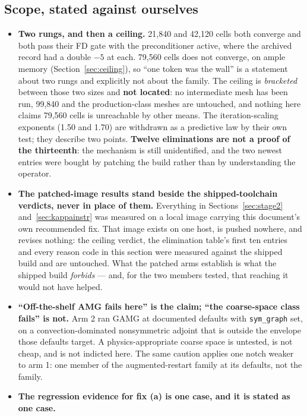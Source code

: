 \documentclass[11pt,a4paper]{article}
\begin{document}
\subsection{Scope, stated against ourselves}

\begin{itemize}
\item \textbf{Two rungs, and then a ceiling.} 21{,}840 and 42{,}120 cells both converge and
both pass their FD gate with the preconditioner active, where the archived record had a double
\(-5\) at each. 79{,}560 cells does not converge, on ample memory
(Section~\ref{sec:ceiling}), so ``one token was the wall'' is a statement about two rungs and
explicitly not about the family. The ceiling is \emph{bracketed} between those two sizes and
\textbf{not located}: no intermediate mesh has been run, 99{,}840 and the production-class
meshes are untouched, and nothing here claims 79{,}560 cells is unreachable by other means.
The iteration-scaling exponents (1.50 and 1.70) are withdrawn as a predictive law by their own
test; they describe two points. \textbf{Twelve eliminations are not a proof of the thirteenth}:
the mechanism is still unidentified, and the two newest entries were bought by patching the
build rather than by understanding the operator.
\item \textbf{The patched-image results stand beside the shipped-toolchain verdicts, never in
place of them.} Everything in Sections~\ref{sec:stage2} and~\ref{sec:kappainstr} was measured on
a local image carrying this document's own recommended fix. That image exists on one host, is
pushed nowhere, and revises nothing: the ceiling verdict, the elimination table's first ten
entries and every reason code in this section were measured against the shipped build and are
untouched. What the patched arms establish is what the shipped build \emph{forbids} --- and, for
the two members tested, that reaching it would not have helped.
\item \textbf{``Off-the-shelf AMG fails here'' is the claim; ``the coarse-space class fails'' is
not.} Arm 2 ran GAMG at documented defaults with \texttt{sym\_graph} set, on a
convection-dominated nonsymmetric adjoint that is outside the envelope those defaults target. A
physics-appropriate coarse space is untested, is not cheap, and is not indicted here. The same
caution applies one notch weaker to arm 1: one member of the augmented-restart family at its
defaults, not the family.
\item \textbf{The regression evidence for fix (a) is one case, and it is stated as one case.}

\end{itemize}
\end{document}
